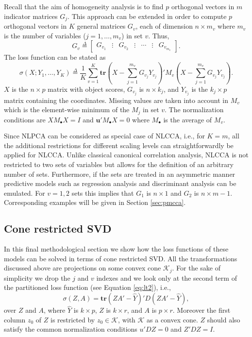 \documentclass[article, nojss]{jss}
\newcommand{\defi}{\mathop{=}\limits^{\Delta}}
\begin{document}
Recall that the aim of homogeneity analysis is to find $p$ orthogonal vectors in $m$ indicator matrices $G_j$. 
This approach can be extended in order to compute $p$ orthogonal vectors in $K$ general matrices $G_v$, each of dimension $n \times m_v$ where $m_v$ is the number of variables ($j = 1,\ldots ,m_v$) in set $v$. Thus, 
\begin{equation}
G_v\defi\begin{bmatrix}G_{v_1}&\vdots&G_{v_2}&\vdots&\cdots&\vdots&G_{v_{m_v}}\end{bmatrix}.
\end{equation}
The loss function can be stated as
\begin{equation}
\label{eq:lcca}
\sigma(X;Y_1,\ldots,Y_K)\defi\frac{1}{K}\sum_{v=1}^K\mathbf{tr}\left(X-\sum_{j=1}^{m_v}G_{v_j}Y_{v_j}\right)'M_v\left(X-\sum_{j=1}^{m_v}G_{v_j}Y_{v_j}\right).
\end{equation}
$X$ is the $n \times p$ matrix with object scores, $G_{v_j}$ is $n \times k_j$, and $Y_{v_j}$ is the $k_j \times p$ matrix containing the coordinates. Missing values are taken into account in $M_v$ which is the element-wise minimum of the $M_j$ in set $v$. The normalization conditions are $XM_\bullet X = I$ and $\mathbf{u}'M_\bullet X=0$ where $M_\bullet$ is the average of $M_v$.

Since NLPCA can be considered as special case of NLCCA, i.e., for $K=m$, all the additional restrictions for different scaling levels can straightforwardly be applied for NLCCA. 
Unlike classical canonical correlation analysis, NLCCA is not restricted to two sets of variables but allows for the definition of an arbitrary number of sets. Furthermore, if the sets are treated in an asymmetric manner predictive models such as regression analysis and discriminant analysis can be emulated. For $v=1,2$ sets this implies that $G_1$ is $n \times 1$ and $G_2$ is $n \times m-1$. Corresponding examples will be given in Section \ref{sec:pmcca}.

\subsection{Cone restricted SVD}
In this final methodological section we show how the loss functions of these models can be solved in terms of cone restricted SVD. All the transformations discussed above are projections on some convex cone $\mathcal{K}_j$.  
For the sake of simplicity we drop the $j$ and $v$ indexes and we look only at the second term of the partitioned loss function (see Equation \ref{eq:lt2}), i.e., 
\begin{equation}
\sigma(Z,A)=\mathbf{tr}(ZA'-\hat Y)'D(ZA'- \hat Y),
\end{equation}
over $Z$ and $A$, where $\hat Y$ is $k\times p$, $Z$ is $k\times r$, and $A$ is $p\times r$. Moreover
the first column $z_0$ of $Z$ is restricted by $z_0\in\mathcal{K}$, with $\mathcal{K}$
as a convex cone. $Z$ should also satisfy the common normalization conditions $u'DZ=0$ and $Z'DZ=I$.
\end{document}
